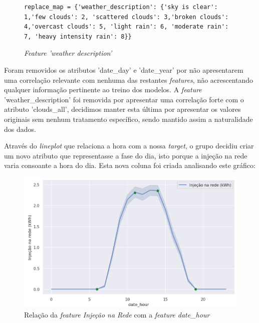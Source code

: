 \begin{figure}[H]
    \centering
    \begin{verbatim}
replace_map = {'weather_description': {'sky is clear': 1,'few clouds': 2, 'scattered clouds': 3,'broken clouds': 4,'overcast clouds': 5, 'light rain': 6, 'moderate rain': 7, 'heavy intensity rain': 8}}
    \end{verbatim}
    \caption{\textit{Feature 'weather description'}}
    \label{fig2}
\end{figure}

Foram removidos os atributos 'date\_day' e 'date\_year' por não apresentarem uma correlação relevante com nenhuma das restantes \textit{features}, não acrescentando qualquer informação pertinente ao treino dos modelos.
A \textit{feature} 'weather\_description' foi removida por apresentar uma correlação forte com o atributo 'clouds\_all', decidimos manter esta última por apresentar os valores originais sem nenhum tratamento específico, sendo mantido assim a naturalidade dos dados.

Através do \textit{lineplot} que relaciona a hora com a nossa \textit{target}, o grupo decidiu criar um novo atributo que representasse a fase do dia, isto porque a injeção na rede varia consoante a hora do dia. Esta nova coluna foi criada analisando este gráfico:

\begin{figure}[H]
    \centering
    \centerline{\includegraphics[width=1\textwidth]{Imagens/Competição/line_plot_competicao.png}}
    \caption{Relação da \textit{feature Injeção na Rede} com a \textit{feature date\_hour}}
    \label{fig}
\end{figure}

